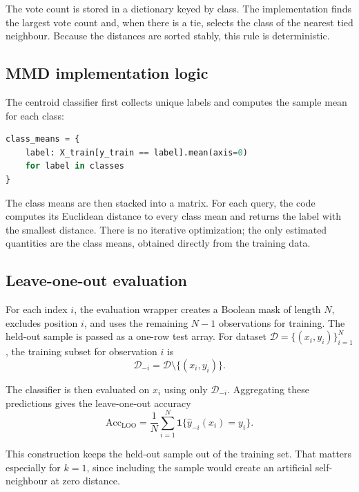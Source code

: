 \documentclass[11pt,a4paper]{article}
\begin{document}
The vote count is stored in a dictionary keyed by class. The implementation finds the largest vote count and, when there is a tie, selects the class of the nearest tied neighbour. Because the distances are sorted stably, this rule is deterministic.

\subsection{MMD implementation logic}

The centroid classifier first collects unique labels and computes the sample mean for each class:
\begin{lstlisting}[language=Python]
class_means = {
    label: X_train[y_train == label].mean(axis=0)
    for label in classes
}
\end{lstlisting}

The class means are then stacked into a matrix. For each query, the code computes its Euclidean distance to every class mean and returns the label with the smallest distance. There is no iterative optimization; the only estimated quantities are the class means, obtained directly from the training data.

\subsection{Leave-one-out evaluation}

For each index $i$, the evaluation wrapper creates a Boolean mask of length $N$, excludes position $i$, and uses the remaining $N-1$ observations for training. The held-out sample is passed as a one-row test array. For dataset $\mathcal{D}=\{(x_i,y_i)\}_{i=1}^{N}$, the training subset for observation $i$ is
\begin{equation}
 \mathcal{D}_{-i}
 =
 \mathcal{D}\setminus\{(x_i,y_i)\}.
\end{equation}

The classifier is then evaluated on $x_i$ using only $\mathcal{D}_{-i}$. Aggregating these predictions gives the leave-one-out accuracy
\begin{equation}
 \mathrm{Acc}_{\mathrm{LOO}}
 =
 \frac{1}{N}
 \sum_{i=1}^{N}
 \mathbf{1}\{\hat{y}_{-i}(x_i)=y_i\}.
\end{equation}

This construction keeps the held-out sample out of the training set. That matters especially for $k=1$, since including the sample would create an artificial self-neighbour at zero distance.
\end{document}
